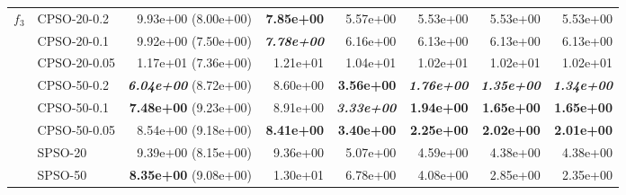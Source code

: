 \documentclass[a4paper,twoside]{article}
\begin{document}
\begin{table}
\begin{tabular}{|| l | l | r | r | r | r | r | r ||}
$f_3$   &   CPSO-20-0.2   &  9.93e+00 (8.00e+00)               &  {\bf 7.85e+00}         &  5.57e+00               &  5.53e+00               &  5.53e+00               &  5.53e+00  \\
    \cline{2-8}
        &   CPSO-20-0.1   &  9.92e+00 (7.50e+00)               &  {\bf \emph{7.78e+00}}  &  6.16e+00               &  6.13e+00               &  6.13e+00               &  6.13e+00  \\
    \cline{2-8}
        &   CPSO-20-0.05  &  1.17e+01 (7.36e+00)               &  1.21e+01               &  1.04e+01               &  1.02e+01               &  1.02e+01               &  1.02e+01  \\
    \cline{2-8} 
        &   CPSO-50-0.2   &  {\bf \emph{6.04e+00}} (8.72e+00)  &  8.60e+00               &  {\bf 3.56e+00}         &  {\bf \emph{1.76e+00}}  &  {\bf \emph{1.35e+00}}  &  {\bf \emph{1.34e+00}}  \\
    \cline{2-8}
        &   CPSO-50-0.1   &  {\bf 7.48e+00} (9.23e+00)         &  8.91e+00               &  {\bf \emph{3.33e+00}}  &  {\bf 1.94e+00}         &  {\bf 1.65e+00}         &  {\bf 1.65e+00}  \\
    \cline{2-8}
        &   CPSO-50-0.05  &  8.54e+00 (9.18e+00)               &  {\bf 8.41e+00}         &  {\bf 3.40e+00}         &  {\bf 2.25e+00}         &  {\bf 2.02e+00}         &  {\bf 2.01e+00}  \\
\hline \hline
        &   SPSO-20       &  9.39e+00 (8.15e+00)               &  9.36e+00               &  5.07e+00               &  4.59e+00               &  4.38e+00               &  4.38e+00  \\
    \cline{2-8}
        &   SPSO-50       &  {\bf 8.35e+00} (9.08e+00)         &  1.30e+01               &  6.78e+00               &  4.08e+00               &  2.85e+00               &  2.35e+00  \\

\hline \hline \hline


\end{tabular}
\end{table}
\end{document}
